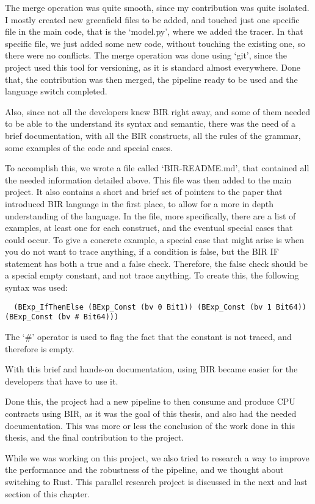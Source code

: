 The merge operation was quite smooth, since my contribution was quite isolated. I
mostly created new greenfield files to be added, and touched just one specific
file in the main code, that is the `model.py', where we added the tracer. In that
specific file, we just added some new code, without touching the existing one,
so there were no conflicts. The merge operation was done using `git', since the
project used this tool for versioning, as it is standard almost everywhere. Done
that, the contribution was then merged, the pipeline ready to be used and the
language switch completed.

Also, since not all the developers knew BIR right away, and some of them needed
to be able to the understand its syntax and semantic, there was the need of a brief
documentation, with all the BIR constructs, all the rules of the grammar, some
examples of the code and special cases.

To accomplish this, we wrote a file called `BIR-README.md', that contained all
the needed information detailed above. This file was then added to the main project.
It also contains a short and brief set of pointers to the paper that introduced
BIR language in the first place, to allow for a more in depth understanding of the
language. In the file, more specifically, there are a list of examples, at least
one for each construct, and the eventual special cases that could occur. To give
a concrete example, a special case that might arise is when you do not want to
trace anything, if a condition is false, but the BIR IF statement has both a
true and a false check. Therefore, the false check should be a special empty
constant, and not trace anything. To create this, the following syntax was used:
\begin{verbatim}
  (BExp_IfThenElse (BExp_Const (bv 0 Bit1)) (BExp_Const (bv 1 Bit64)) (BExp_Const (bv # Bit64)))
\end{verbatim}
The `\#' operator is used to flag the fact that the constant is not traced, and therefore
is empty.

With this brief and hands-on documentation, using BIR became easier for the
developers that have to use it.

Done this, the project had a new pipeline to then consume and produce CPU contracts
using BIR, as it was the goal of this thesis, and also had the needed documentation.
This was more or less the conclusion of the work done in this thesis, and the final
contribution to the project.

While we was working on this project, we also tried to research a way to improve
the performance and the robustness of the pipeline, and we thought about switching
to Rust. This parallel research project is discussed in the next and last
section of this chapter.

